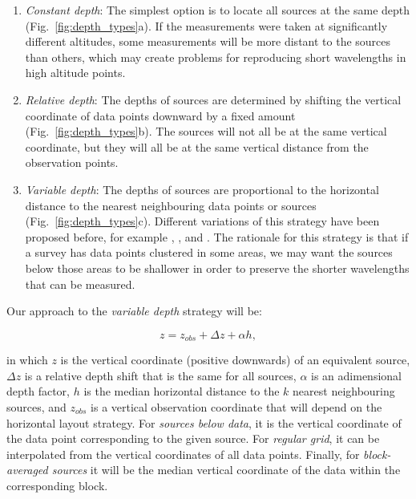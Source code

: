 \begin{enumerate}
  \item
    \emph{Constant depth}:
    The simplest option is to locate all sources at the same depth
    (Fig.~\ref{fig:depth_types}a).
    If the measurements were taken at significantly different altitudes, some
    measurements will be more distant to the sources than others,
    which may create problems for reproducing short wavelengths in high
    altitude points.
 \item
    \emph{Relative depth}:
    The depths of sources are determined by shifting the vertical coordinate of
    data points downward by a fixed amount (Fig.~\ref{fig:depth_types}b).
    The sources will not all be at the same vertical coordinate, but they will
    all be at the same vertical distance from the observation points.
 \item
    \emph{Variable depth}:
    The depths of sources are proportional to the horizontal distance to the
    nearest neighbouring data points or sources (Fig.~\ref{fig:depth_types}c).
    Different variations of this strategy have been proposed before, for
    example \citet{cordell1992}, \citet{guspi2004}, and \citet{guspi2009}.
    The rationale for this strategy is that if a survey has data points
    clustered in some areas, we may
    want the sources below those areas to be shallower in order to preserve the
    shorter wavelengths that can be measured.
\end{enumerate}

Our approach to the \emph{variable depth} strategy will be:

\begin{equation}
  z = z_{obs} + \Delta z + \alpha h,
  \label{eq:variable_depth}
\end{equation}

\noindent
in which $z$ is the vertical coordinate (positive downwards) of an equivalent
source,
$\Delta z$ is a relative depth shift that is the same for all sources,
$\alpha$ is an adimensional depth factor,
$h$ is the median horizontal distance to the $k$ nearest neighbouring sources,
and
$z_{obs}$ is a vertical observation coordinate that will depend on the
horizontal layout strategy.
For \emph{sources below data}, it is the vertical coordinate of the data point
corresponding to the given source.
For \emph{regular grid}, it can be interpolated from the vertical coordinates
of all data points.
Finally, for \emph{block-averaged sources} it will be the median vertical
coordinate of the data within the corresponding block.

